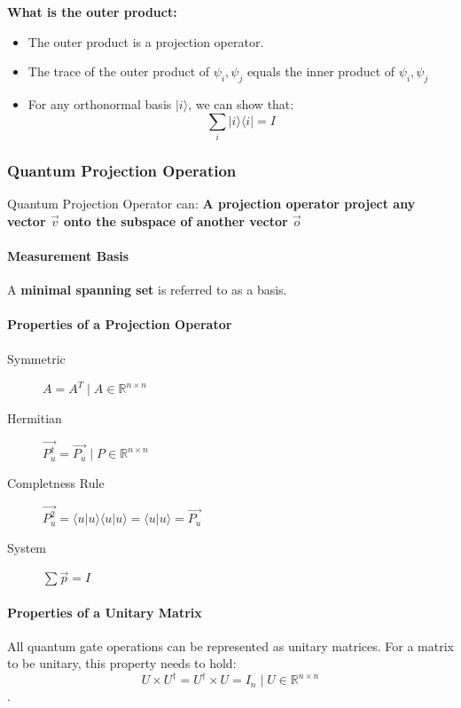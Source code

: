 \documentclass[11pt]{article}
\providecommand{\bra}[1]{\langle#1|}
\providecommand{\ket}[1]{|#1\rangle}
\providecommand{\braket}[2]{\langle#1|#2\rangle}
\theoremstyle{definition}
\theoremstyle{definition}
\begin{document}
\textbf{What is the outer product:}
\begin{itemize}
\item The outer product is a projection operator.
\item The trace of the outer product of \(\psi_i, \psi_j\) equals the inner product of \(\psi_i, \psi_j\)
\item For any orthonormal basis \(\ket{i}\), we can show that:
$$\sum_{i} \ket{i}\bra{i} = I$$
\end{itemize}

\subsubsection{Quantum Projection Operation}
\label{sec:org13885d2}
 Quantum Projection Operator can:
\textbf{A projection operator project any vector \(\vec{v}\) onto the subspace of another vector \(\vec{o}\)}

\paragraph{Measurement Basis}
\label{sec:orgc3182bf}
A \textbf{minimal spanning set} is referred to as a basis.

\paragraph{Properties of a Projection Operator}
\label{sec:org8fba414}
\begin{description}
\item[{Symmetric}] \(A = A^T \mid A \in \mathbb{R}^{n \times n}\)
\item[{Hermitian}] \(\vec{P_u^\dagger} = \vec{P_u} \mid P \in \mathbb{R}^{n \times n}\)
\item[{Completness Rule}] \(\vec{P_u^2} = \braket{u}{u}\braket{u}{u} = \braket{u}{u} = \vec{P_u}\)
\item[{System}] \(\sum\vec{p} = I\)
\end{description}

\paragraph{Properties of a Unitary Matrix}
\label{sec:orgac316c3}
All quantum gate operations can be represented as unitary matrices. For a
matrix to be unitary, this property needs to hold:
$$U \times U^\dagger = U^\dagger \times U = I_n \mid U \in \mathbb{R}^{n \times n}$$.
\end{document}
